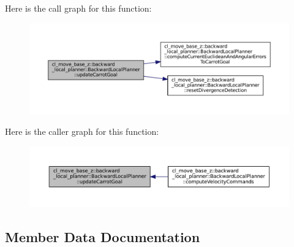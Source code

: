 Here is the call graph for this function\+:
\nopagebreak
\begin{figure}[H]
\begin{center}
\leavevmode
\includegraphics[width=350pt]{classcl__move__base__z_1_1backward__local__planner_1_1BackwardLocalPlanner_a16e79a1b4c0f18879f6f0a8ba67103fd_cgraph}
\end{center}
\end{figure}
Here is the caller graph for this function\+:
\nopagebreak
\begin{figure}[H]
\begin{center}
\leavevmode
\includegraphics[width=350pt]{classcl__move__base__z_1_1backward__local__planner_1_1BackwardLocalPlanner_a16e79a1b4c0f18879f6f0a8ba67103fd_icgraph}
\end{center}
\end{figure}


\subsection{Member Data Documentation}
\mbox{\label{classcl__move__base__z_1_1backward__local__planner_1_1BackwardLocalPlanner_a09765b08935d9355447c44776e1b1c3a}} 
